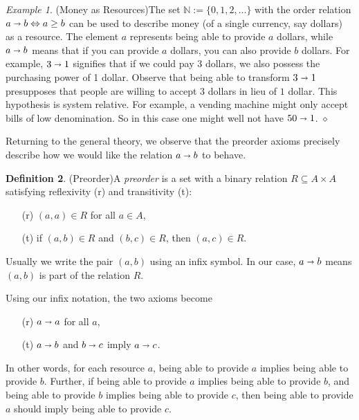 \documentclass[12pt]{article}
\theoremstyle{definition}
\newtheorem{definition}{Definition}[section]
\theoremstyle{plain}
\theoremstyle{plain}
\theoremstyle{plain}
\theoremstyle{plain}
\theoremstyle{remark}
\newtheorem{example}[definition]{Example}
\newcommand\xqed[1]{%
	\leavevmode\unskip\penalty9999 \hbox{}\nobreak\hfill
	\quad\hbox{#1}}
\newcommand\exampleend{\xqed{$\diamond$}}
\theoremstyle{remark}
\newcommand{\sub}{\subseteq}
\begin{document}
\begin{example}(Money as Resources)\label{ex:money}
	The set $\mathbb{N} := \{0,1,2,\ldots \}$ with the order relation $a \shortrightarrow b \Leftrightarrow a \geq b$ can be used to describe money (of a single currency, say dollars) as a resource. The element $a$ represents being able to provide $a$ dollars, while $a \shortrightarrow b$ means that if you can provide $a$ dollars, you can also provide $b$ dollars. For example, $3 \shortrightarrow 1$ signifies that if we could pay 3 dollars, we also possess the purchasing power of 1 dollar. Observe that being able to transform $3 \shortrightarrow 1$ presupposes that people are willing to accept $3$ dollars in lieu of $1$ dollar. This hypothesis is system relative. For example, a vending machine might only accept bills of low denomination. So in this case one might well not have $50 \shortrightarrow 1$. \exampleend
\end{example}

Returning to the general theory, we observe that the preorder axioms precisely describe how we would like the relation $a \shortrightarrow b$ to behave.

\begin{definition}(Preorder)\label{def:preorder}
	A \emph{preorder} is a set with a binary relation $R \sub A \times A$ satisfying reflexivity (r) and transitivity (t):
	\begin{itemize}
		\item[(r)] $(a,a) \in R$ for all $a \in A$,
		\item[(t)] if $(a,b) \in R$ and $(b,c) \in R$, then $(a,c) \in R$.
	\end{itemize}
	Usually we write the pair $(a,b)$ using an infix symbol. In our case, $a \shortrightarrow b$ means $(a,b)$ is part of the relation $R$.
\end{definition}

Using our infix notation, the two axioms become 
\begin{itemize}
	\item[(r)] $a \shortrightarrow a$ for all $a$,
	\item[(t)] $a \shortrightarrow b$ and $b \shortrightarrow c$ imply $a \shortrightarrow c$.
\end{itemize}  
In other words, for each resource $a$, being able to provide $a$ implies being able to provide $b$. Further, if being able to provide $a$ implies being able to provide $b$, and being able to provide $b$ implies being able to provide $c$, then being able to provide $a$ should imply being able to provide $c$. \\
\end{document}
